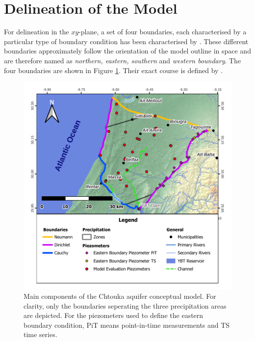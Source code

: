 
\section{Delineation of the Model}
\label{Sec-Delineation}

For delineation in the $xy$-plane, a set of four boundaries, each characterised by a particular type of boundary condition has been characterised by \cite{Horn.2021}. These different boundaries approximately follow the orientation of the model outline in space and are therefore named as \textit{northern, eastern, southern} and \textit{western boundary}. The four boundaries are shown in Figure \ref{Map-BCPzPrec}. Their exact course is defined by \textcite{Anzar.2016}.

\begin{figure}[h]
    \centering
    \includegraphics{./img/Map-BCPzPrec.pdf}
    \caption{Main components of the Chtouka aquifer conceptual model. For clarity, only the boundaries seperating the three precipitation areas are depicted. For the piezometers used to define the eastern boundary condition, PiT means point-in-time measurements and TS time series.}
    \label{Map-BCPzPrec}
\end{figure}


